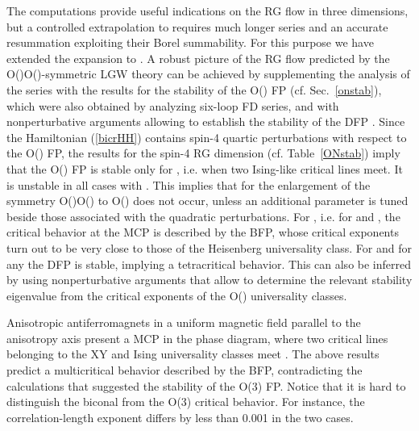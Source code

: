\documentclass[a4paper,12pt]{article}
\begin{document}
The \coordHE{} computations provide useful indications on the 
RG flow in three  dimensions, but a controlled 
extrapolation to \coordHE{} requires much longer series
and an accurate resummation exploiting their Borel summability.
For this purpose we have extended the \myHighlight{$\epsilon$}\coordHE{} expansion
to \coordHE{} \cite{CPV-02-mc}.  
A robust picture of the RG flow predicted by
the  O(\coordHE{})\myHighlight{$\oplus$}\coordHE{}O(\coordHE{})-symmetric
LGW theory can be achieved 
by supplementing the analysis of the \myHighlight{$\epsilon$}\coordHE{} series 
with the results for the stability of
the O(\coordHE{}) FP (cf. Sec.~\ref{onstab}),
which were also obtained by analyzing six-loop FD series,
and with nonperturbative arguments allowing to establish
the stability of the DFP \cite{Aharony-02}.
Since the Hamiltonian (\ref{bicrHH}) contains spin-4 quartic perturbations
with respect to the O(\coordHE{}) FP,
the results for the spin-4 RG dimension \coordHE{} 
(cf. Table~\ref{ONstab})
imply that the O(\coordHE{}) FP is stable only for \coordHE{}, i.e.
when two Ising-like critical lines meet.
It is  unstable in all cases with \coordHE{}.
This implies that for \coordHE{} the enlargement of the symmetry 
O(\coordHE{})\myHighlight{$\oplus$}\coordHE{}O(\coordHE{}) to O(\coordHE{}) does not occur, unless
an additional parameter is tuned
beside those associated with the quadratic perturbations. 
For \coordHE{}, i.e. for \coordHE{} and \coordHE{},
 the critical behavior at the MCP is described by the BFP,
whose critical exponents turn out to be very close to those of
the Heisenberg universality class.
For \coordHE{} and for any \coordHE{}
the DFP is stable, implying a tetracritical behavior.
This can also be inferred by using nonperturbative arguments 
\cite{Aharony-02}
that allow to determine the relevant stability eigenvalue
from the critical exponents of the O(\coordHE{})
universality classes.

Anisotropic antiferromagnets in a uniform magnetic field \coordHE{}
parallel to the anisotropy axis present a MCP 
in the \coordHE{} phase diagram, where two critical lines
belonging to the XY and Ising universality classes meet \cite{KNF-76}. 
The above results predict a multicritical behavior
described by the BFP, contradicting the \coordHE{} calculations
that suggested the stability of the O(3) FP.
Notice that it is hard to distinguish 
the biconal from the  O(3) critical behavior.
For instance, the correlation-length exponent
\myHighlight{$\nu$}\coordHE{} differs by less than 0.001 in the two cases.
\end{document}
